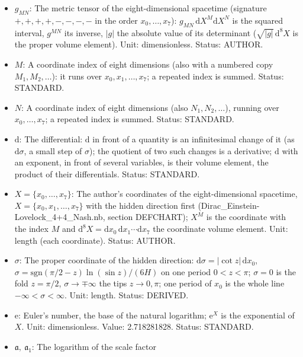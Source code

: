 \documentclass[
  10pt,
]{article}
\providecommand{\tightlist}{%
  \setlength{\itemsep}{0pt}\setlength{\parskip}{0pt}}
\begin{document}
\begin{itemize}
\tightlist
\item
  \(g_{MN}\): The metric tensor of the eight-dimensional spacetime
  (signature \(+,+,+,+,-,-,-,-\) in the order \(x_0, \dots, x_7\)):
  \(g_{MN}\,\mathrm{d}X^M\mathrm{d}X^N\) is the squared interval,
  \(g^{MN}\) its inverse, \(\lvert g\rvert\) the absolute value of its
  determinant (\(\sqrt{\lvert g\rvert}\,\mathrm{d}^8X\) is the proper
  volume element). Unit: dimensionless. Status: AUTHOR.
\item
  \(M\): A coordinate index of eight dimensions (also with a numbered
  copy \(M_1, M_2, \dots\)): it runs over \(x_0, x_1, \dots, x_7\); a
  repeated index is summed. Status: STANDARD.
\item
  \(N\): A coordinate index of eight dimensions (also
  \(N_1, N_2, \dots\)), running over \(x_0, \dots, x_7\); a repeated
  index is summed. Status: STANDARD.
\item
  \(\mathrm{d}\): The differential: \(\mathrm{d}\) in front of a
  quantity is an infinitesimal change of it (as \(\mathrm{d}\sigma\), a
  small step of \(\sigma\)); the quotient of two such changes is a
  derivative; \(\mathrm{d}\) with an exponent, in front of several
  variables, is their volume element, the product of their
  differentials. Status: STANDARD.
\item
  \(X = \{x_0, \dots, x_7\}\): The author's coordinates of the
  eight-dimensional spacetime, \(X = \{x_0, x_1, \dots, x_7\}\) with the
  hidden direction first (Dirac\_Einstein-Lovelock\_4+4\_Nash.nb,
  section DEFCHART); \(X^M\) is the coordinate with the index \(M\) and
  \(\mathrm{d}^8X = \mathrm{d}x_0\,\mathrm{d}x_1\cdots\mathrm{d}x_7\)
  the coordinate volume element. Unit: length (each coordinate). Status:
  AUTHOR.
\item
  \(\sigma\): The proper coordinate of the hidden direction:
  \(\mathrm{d}\sigma = \lvert\cot z\rvert\,\mathrm{d}x_0\),
  \(\sigma = \mathrm{sgn}(\pi/2 - z)\ln(\sin z)/(6H)\) on one period
  \(0 < z < \pi\); \(\sigma = 0\) is the fold \(z = \pi/2\),
  \(\sigma \to \mp\infty\) the tips \(z \to 0, \pi\); one period of
  \(x_0\) is the whole line \(-\infty < \sigma < \infty\). Unit: length.
  Status: DERIVED.
\item
  \(\mathrm{e}\): Euler's number, the base of the natural logarithm;
  \(\mathrm{e}^{X}\) is the exponential of \(X\). Unit: dimensionless.
  Value: 2.718281828. Status: STANDARD.
\item
  \(\mathfrak{a},\ \mathfrak{a}_1\): The logarithm of the scale factor

\end{itemize}
\end{document}
